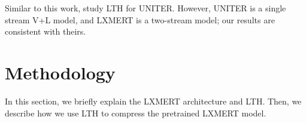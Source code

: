 \documentclass[11pt,a4paper]{article}
\begin{document}
Similar to this work, \citet{gan2021playing} study LTH for UNITER\cite{chen2020uniter}. However, UNITER is a single stream V+L model, and LXMERT is a two-stream model; our results are consistent with theirs.

\section{Methodology}
In this section, we briefly explain the LXMERT architecture and LTH. Then, we describe how we use LTH to compress the pretrained LXMERT model.

\begin{table*}[ht]
    \centering
    \caption{\label{table1} Performance of subnetworks at 50\% weights pruning on VQA v2, which reported for both test-dev and test-std. Test-dev is used for debugging and validation experiments. Test-standard is the default test data for the VQA competition. We test each experiment for three different seeds and report the mean and standard deviation of VQA accuracy across three seeds.}
    \vspace{-2mm}    
\end{table*}
\end{document}

